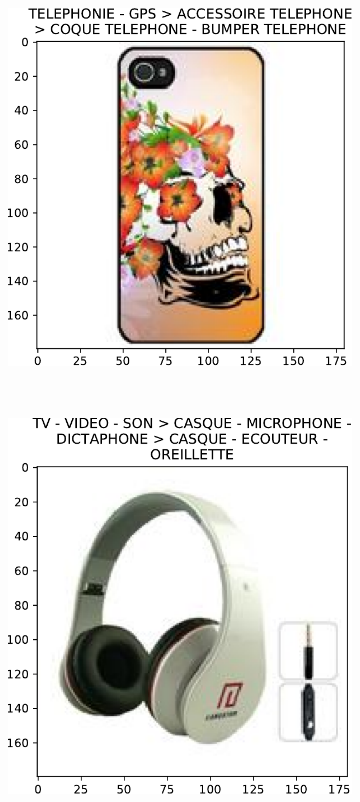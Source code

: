 \begin{figure}
    \centering
    \begin{subfigure}[t]{0.33\columnwidth}
        \centering
        \includegraphics[width=\textwidth]{img/img-0-0}
        \caption{}
    \end{subfigure}%
    ~ 
    \begin{subfigure}[t]{0.33\columnwidth}
        \centering
        \includegraphics[width=\textwidth]{img/img-12-0}

\end{subfigure}
\end{figure}
